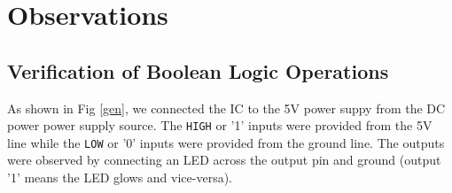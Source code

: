 \section{Observations}

\subsection*{Verification of Boolean Logic Operations}

\noindent As shown in Fig \ref{gen}, we connected the IC to the 5V power suppy from the DC power power supply source. The \verb|HIGH| or '1' inputs were provided from the 5V line while the \verb|LOW| or '0' inputs were provided from the ground line. The outputs were observed by connecting an LED across the output pin and ground (output '1' means the LED glows and vice-versa).\\

